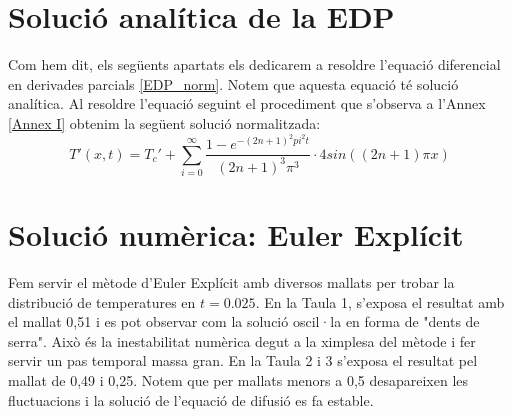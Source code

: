 \documentclass{article}
\begin{document}
\section{Solució analítica de la EDP}
Com hem dit, els següents apartats els dedicarem a resoldre l'equació diferencial en derivades parcials \eqref{EDP_norm}. Notem que aquesta equació té solució analítica. Al resoldre l'equació seguint el procediment que s'observa a l'Annex \ref{Annex I} obtenim la següent solució normalitzada:
\begin{equation*}
    T'(x,t) = T_c' + \sum_{i=0}^{\infty} \frac{ 1-e^{-(2n+1)^2 pi^2 t}}{(2n+1)^3\pi^3}\cdot 4sin((2n+1)\pi x)
\end{equation*}


\section{Solució numèrica: Euler Explícit}
Fem servir el mètode d'Euler Explícit amb diversos mallats per trobar la distribució de temperatures en $t=0.025$. En la Taula 1, s'exposa el resultat amb el mallat 0,51 i es pot observar com la solució oscil·la en forma de "dents de serra". Això és la inestabilitat numèrica degut a la ximplesa del mètode i fer servir un pas temporal massa gran.  En la Taula 2 i 3 s'exposa el resultat pel mallat de 0,49 i 0,25. Notem que per mallats menors a 0,5 desapareixen les fluctuacions i la solució de l'equació de difusió es fa estable.
\end{document}
